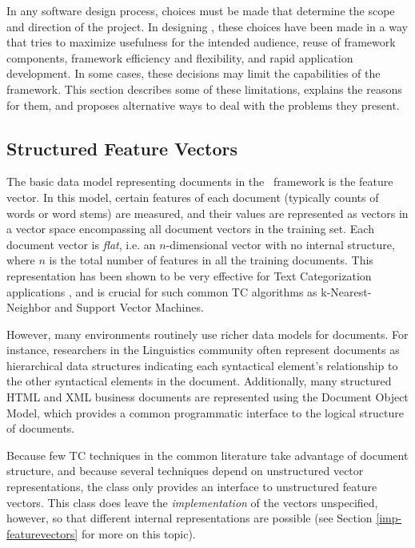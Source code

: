 In any software design process, choices must be made that determine
the scope and direction of the project.  In designing \aicat, these
choices have been made in a way that tries to maximize usefulness for
the intended audience, reuse of framework components, framework
efficiency and flexibility, and rapid application development.  In
some cases, these decisions may limit the capabilities of the
framework.  This section describes some of these limitations, explains
the reasons for them, and proposes alternative ways to deal with the
problems they present.

\subsection{Structured Feature Vectors}

The basic data model representing documents in the \aicat\ framework
is the feature vector.  In this model, certain features of each
document (typically counts of words or word stems) are measured, and
their values are represented as vectors in a vector space encompassing
all document vectors in the training set.  Each document vector is
\emph{flat}, i.e. an $n$-dimensional vector with no internal
structure, where $n$ is the total number of features in all the
training documents.  This representation has been shown to be very
effective for Text Categorization applications
\cite[p. 10]{sebastiani:02}, and is crucial for such common TC
algorithms as k-Nearest-Neighbor and Support Vector Machines.

However, many environments routinely use richer data models for
documents.  For instance, researchers in the Linguistics community
often represent documents as hierarchical data structures indicating
each syntactical element's relationship to the other syntactical
elements in the document.\cite[ch. 11 \& 12]{manning:99} \cite{sag:99}
Additionally, many structured HTML and XML business documents are
represented using the Document Object Model, which provides a common
programmatic interface to the logical structure of
documents.\cite{dom}

Because few TC techniques in the common literature take advantage of
document structure, and because several techniques depend on
unstructured vector representations, the  class
only provides an interface to unstructured feature vectors.  This
class does leave the \emph{implementation} of the vectors unspecified,
however, so that different internal representations are possible (see
Section \ref{imp-featurevectors} for more on this topic).


